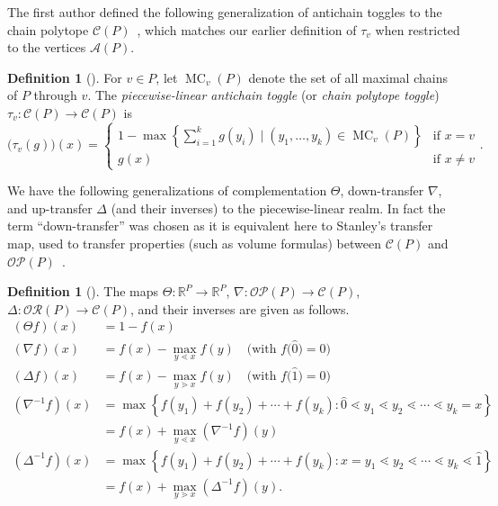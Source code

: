 \documentclass[10pt]{amsart}
\theoremstyle{definition}
\newtheorem{defi}[theo]{Definition}
\newcommand{\defn}[1]{\emph{#1}}
\newcommand{\rr}{\mathbb{R}}
\newcommand{\ra}{\rightarrow}
\newcommand{\down}{\nabla}
\newcommand{\up}{\Delta}
\DeclareMathOperator{\mc}{MC}
\newcommand{\cala}{\mathcal{A}}
\newcommand{\calc}{\mathcal{C}}
\newcommand{\calo}{\mathcal{O}}
\newcommand{\calp}{\mathcal{P}}
\newcommand{\calr}{\mathcal{R}}
\begin{document}
The first author defined the following generalization of antichain toggles to the chain
polytope $\calc(P)$~\cite[\S~3]{antichain-toggling}, which matches our earlier definition
of $\tau_v$ when restricted to the vertices $\cala(P)$. 

\begin{defi}[\cite{antichain-toggling}]\label{def:PL-ant-tog}
For $v\in P$, let $\mc_v(P)$ denote the set of all maximal chains of $P$ through $v$.
The \defn{piecewise-linear antichain toggle}
(or \defn{chain polytope toggle}) $\tau_v:\calc(P)\ra \calc(P)$ is
\[
\big(\tau_v(g)\big)(x) =
\begin{cases}
1-\max\left\{ %
\sum\limits_{i=1}^k g(y_i) %
\mid (y_1,\dots,y_k)\in \mc_v(P) \right\}
&\text{if }x=v\\
g(x) &\text{if }x\not=v
\end{cases}.
\]
\end{defi}

We have the following generalizations of complementation $\Theta$,
down-transfer $\down$, and up-transfer $\up$ (and their inverses)
to the piecewise-linear realm.
In fact the term ``down-transfer'' was chosen as it is equivalent here to
Stanley's transfer map, used to transfer properties (such as volume formulas) between $\calc(P)$
and $\calo\calp(P)$~\cite{Sta86}.

\begin{defi}[{\cite[\S~4]{einpropp}}]
The maps $\Theta: \rr^P \ra \rr^P$, $\down: \calo\calp(P) \ra \calc(P)$,
$\up: \calo\calr(P) \ra \calc(P)$, and their inverses are given as follows.
\begin{align*}
 (\Theta f)(x) &= 1-f(x)\\
 (\down f)(x) &= f(x)-{\max\limits_{y\lessdot x} f(y)} \quad \big(\text{with } f\big(\widehat{0}\big)=0\big)\\
 (\up f)(x) &= 
 f(x) - {\max\limits_{y\gtrdot x} f(y)} \quad \big(\text{with } f\big(\widehat{1}\big)=0\big)\\
 \left(\down^{-1}f\right)(x) &=
 \max\left\{ f(y_1)+f(y_2)+\cdots +f(y_k):
 \widehat{0}\lessdot y_1\lessdot y_2 \lessdot \cdots \lessdot y_k=x \right\}\\
 &=f(x)+ \max\limits_{y\lessdot x}\left(\down^{-1}f\right)(y)\\
 \left(\up^{-1}f\right)(x) &=
 \max\left\{ f(y_1)+ f(y_2)+\cdots +f(y_k):x=y_1
\lessdot y_2\lessdot \cdots \lessdot y_k\lessdot \widehat{1}\right\}\\
 &=f(x)+ \max\limits_{y\gtrdot x}\left(\up^{-1}f\right)(y).
\end{align*}
\end{defi}
\end{document}
